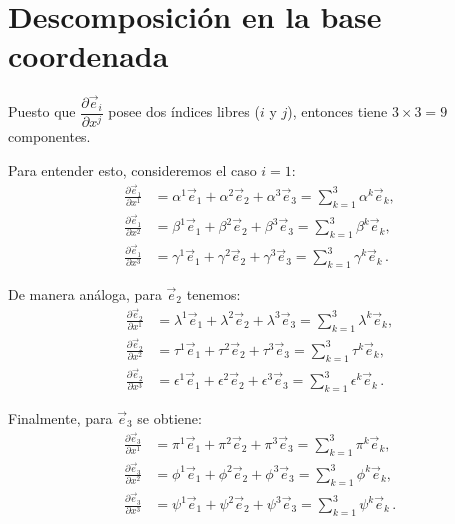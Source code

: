 \documentclass[../apunte_mecanica_clasica.tex]{subfiles}%
\begin{document}
\newpage

\section{Descomposición en la base coordenada}

Puesto que $\dfrac{\partial \vec{e}_i}{\partial x^j}$ posee dos 
índices libres ($i$ y $j$), entonces tiene $3 \times 3 = 9$ componentes.  

Para entender esto, consideremos el caso $i=1$:  
\begin{align*}
    \frac{\partial \vec{e}_1}{\partial x^1} 
        &= \alpha^1 \vec{e}_1 + \alpha^2 \vec{e}_2 + \alpha^3 \vec{e}_3
        = \sum_{k=1}^3 \alpha^k \vec{e}_k, \\[6pt]
    \frac{\partial \vec{e}_1}{\partial x^2} 
        &= \beta^1 \vec{e}_1 + \beta^2 \vec{e}_2 + \beta^3 \vec{e}_3
        = \sum_{k=1}^3 \beta^k \vec{e}_k, \\[6pt]
    \frac{\partial \vec{e}_1}{\partial x^3} 
        &= \gamma^1 \vec{e}_1 + \gamma^2 \vec{e}_2 + \gamma^3 \vec{e}_3
        = \sum_{k=1}^3 \gamma^k \vec{e}_k \,.
\end{align*}

De manera análoga, para $\vec{e}_2$ tenemos:
\begin{align*}
    \frac{\partial \vec{e}_2}{\partial x^1} 
        &= \lambda^1 \vec{e}_1 + \lambda^2 \vec{e}_2 + \lambda^3 \vec{e}_3
        = \sum_{k=1}^3 \lambda^k \vec{e}_k, \\[6pt]
    \frac{\partial \vec{e}_2}{\partial x^2} 
        &= \tau^1 \vec{e}_1 + \tau^2 \vec{e}_2 + \tau^3 \vec{e}_3
        = \sum_{k=1}^3 \tau^k \vec{e}_k, \\[6pt]
    \frac{\partial \vec{e}_2}{\partial x^3} 
        &= \epsilon^1 \vec{e}_1 + \epsilon^2 \vec{e}_2 + \epsilon^3 \vec{e}_3
        = \sum_{k=1}^3 \epsilon^k \vec{e}_k \,.
\end{align*}

Finalmente, para $\vec{e}_3$ se obtiene:
\begin{align*}
    \frac{\partial \vec{e}_3}{\partial x^1} 
        &= \pi^1 \vec{e}_1 + \pi^2 \vec{e}_2 + \pi^3 \vec{e}_3
        = \sum_{k=1}^3 \pi^k \vec{e}_k, \\[6pt]
    \frac{\partial \vec{e}_3}{\partial x^2} 
        &= \phi^1 \vec{e}_1 + \phi^2 \vec{e}_2 + \phi^3 \vec{e}_3
        = \sum_{k=1}^3 \phi^k \vec{e}_k, \\[6pt]
    \frac{\partial \vec{e}_3}{\partial x^3} 
        &= \psi^1 \vec{e}_1 + \psi^2 \vec{e}_2 + \psi^3 \vec{e}_3
        = \sum_{k=1}^3 \psi^k \vec{e}_k \,.
\end{align*}
\end{document}
